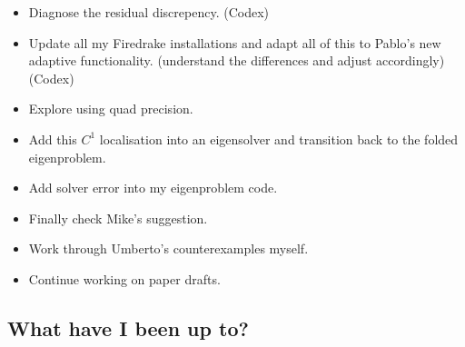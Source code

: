 \documentclass[12pt,a4paper]{article}
\begin{document}
\begin{itemize}
    \item Diagnose the residual discrepency. (Codex)
    \item Update all my Firedrake installations and adapt all of this to Pablo's new adaptive functionality. (understand the differences and adjust accordingly) (Codex)
    \item Explore using quad precision. 
    \item Add this $C^1$ localisation into an eigensolver and transition back to the folded eigenproblem. 
    \item Add solver error into my eigenproblem code. 
    \item Finally check Mike's suggestion.
    \item Work through Umberto's counterexamples myself. 
    \item Continue working on paper drafts. 
\end{itemize}

\subsection{What have I been up to?}
\end{document}
